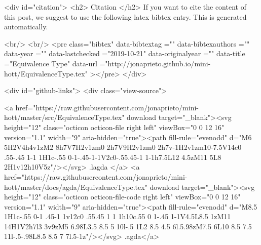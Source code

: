   
  <div id="citation">
  <h2> Citation </h2>
  If you want to cite the content of this post,
  we suggest to use the following latex bibtex entry.
  This is generated automatically.

  <br/>
  <br/>
  <pre class="bibtex"
       data-bibtextag =""
       data-bibtexauthors =""
       data-year =""
       data-lastchecked ="2019-10-21"
       data-originalyear =""
       data-title ="Equivalence Type"
       data-url ="http://jonaprieto.github.io/mini-hott/EquivalenceType.tex"
  ></pre>
  </div>
  

  <div id="github-links">
    <div class="view-source">
      
        <a href="https://raw.githubusercontent.com/jonaprieto/mini-hott/master/src/EquivalenceType.tex" download target="_blank"><svg height="12" class="octicon octicon-file right left" viewBox="0 0 12 16" version="1.1" width="9" aria-hidden="true"><path fill-rule="evenodd" d="M6 5H2V4h4v1zM2 8h7V7H2v1zm0 2h7V9H2v1zm0 2h7v-1H2v1zm10-7.5V14c0 .55-.45 1-1 1H1c-.55 0-1-.45-1-1V2c0-.55.45-1 1-1h7.5L12 4.5zM11 5L8 2H1v12h10V5z"/></svg> .lagda </a>
        <a href="https://raw.githubusercontent.com/jonaprieto/mini-hott/master/docs/agda/EquivalenceType.tex" download target="_blank"><svg height="12" class="octicon octicon-file-code right left" viewBox="0 0 12 16" version="1.1" width="9" aria-hidden="true"><path fill-rule="evenodd" d="M8.5 1H1c-.55 0-1 .45-1 1v12c0 .55.45 1 1 1h10c.55 0 1-.45 1-1V4.5L8.5 1zM11 14H1V2h7l3 3v9zM5 6.98L3.5 8.5 5 10l-.5 1L2 8.5 4.5 6l.5.98zM7.5 6L10 8.5 7.5 11l-.5-.98L8.5 8.5 7 7l.5-1z"/></svg> .agda</a>
      
